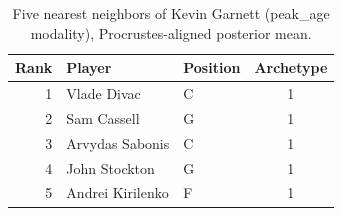 \begin{table}[htbp]
  \centering\small
  \begin{tabular}{rllc}
    \toprule
    Rank & Player & Position & Archetype \\
    \midrule
    1 & Vlade Divac & C & 1 \\
    2 & Sam Cassell & G & 1 \\
    3 & Arvydas Sabonis & C & 1 \\
    4 & John Stockton & G & 1 \\
    5 & Andrei Kirilenko & F & 1 \\
    \bottomrule
  \end{tabular}
  \caption{Five nearest neighbors of Kevin Garnett (peak_age modality), Procrustes-aligned posterior mean.}
  \label{tab:Kevin_Garnett_neighbors_peak_age}
\end{table}

